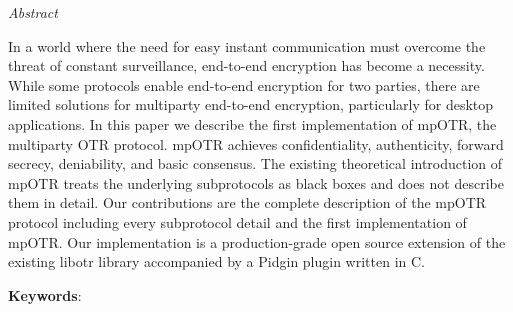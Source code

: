 \documentclass[
11pt, %
english, %
singlespacing, %
parskip, %
headsepline, %
]{MastersDoctoralThesis} %
\begin{document}

\thispagestyle{plain}
\begin{center}
  {\huge\textit{Abstract} \par}
  \bigskip
\end{center}

In a world where the need for easy instant communication must overcome the threat of constant surveillance, end-to-end encryption has become a necessity.
While some protocols enable end-to-end encryption for two parties, there are limited solutions for multiparty end-to-end encryption, particularly for desktop applications.
In this paper we describe the first implementation of mpOTR, the multiparty OTR protocol.
mpOTR achieves confidentiality, authenticity, forward secrecy, deniability, and basic consensus.
The existing theoretical introduction of mpOTR treats the underlying subprotocols as black boxes and does not describe them in detail.
Our contributions are the complete description of the mpOTR protocol including every subprotocol detail and the first implementation of mpOTR.
Our implementation is a production-grade open source extension of the existing libotr library accompanied by a Pidgin plugin written in C.

  \vspace*{\fill}

{\bf Keywords}: \keywordnames


\end{document}
